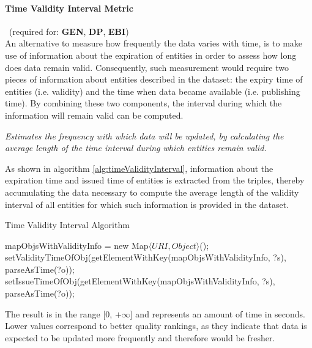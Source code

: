 \paragraph{Time Validity Interval Metric}~(required for: \textbf{GEN}, \textbf{DP}, \textbf{EBI})~\\ %
An alternative to measure how frequently the data varies with time, is to make use of information about the expiration of entities in order to assess how long does data remain valid. Consequently, such measurement would require two pieces of information about entities described in the dataset: the expiry time of entities (i.e. validity) and the time when data became available (i.e. publishing time). By combining these two components, the interval during which the information will remain valid can be computed.
\begin{mdframed}[style=metricdefinition]
\emph{Estimates the frequency with which data will be updated, by calculating the average length of the time interval during which entities remain valid.}
\end{mdframed}

As shown in algorithm \ref{alg:timeValidityInterval}, information about the expiration time and issued time of entities is extracted from the triples, thereby accumulating the data necessary to compute the average length of the validity interval of all entities for which such information is provided in the dataset.
\begin{algorithm}
\caption{Time Validity Interval Algorithm} \label{alg:timeValidityInterval}
\begin{algorithmic}[1]
\State mapObjsWithValidityInfo = new Map$\langle URI, Object\rangle$();
\EndProcedure
{}
\State setValidityTimeOfObj(getElementWithKey(mapObjsWithValidityInfo, ?s), parseAsTime(?o));
\EndIf
{} 
\State setIssueTimeOfObj(getElementWithKey(mapObjsWithValidityInfo, ?s), parseAsTime(?o));
\EndIf ~\\
\EndProcedure
\end{algorithmic}
\end{algorithm}
The result is in the range [0, $+\infty$] and represents an amount of time in seconds. Lower values correspond to better quality rankings, as they indicate that data is expected to be updated more frequently and therefore would be fresher.

